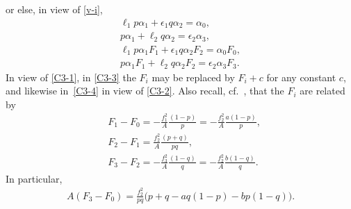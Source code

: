 \documentclass[pdftex]{sigma}
\numberwithin{equation}{section}
\begin{document}
or else, in view of \eqref{v-i},
\begin{gather} \ell _1 p \alpha _1 + \epsilon _1 q \alpha _2 = \alpha _0, \label{C3-1}\\
 p \alpha _1 + \ell _2 q \alpha _2 = \epsilon _2 \alpha _3,\label{C3-2} \\
 \ell _1 p \alpha _1 F_1 + \epsilon _1 q \alpha _2 F_2 = \alpha _0 F_0, \label{C3-3}\\
 p \alpha _1 F_1 + \ell _2 q \alpha _2 F_2 = \epsilon _2 \alpha _3 F_3. \label{C3-4}\end{gather}
In view of \eqref{C3-1}, in \eqref{C3-3} the $F_i$ may be replaced by $F_i + c$ for any constant $c$, and likewise in~\eqref{C3-4} in view of \eqref{C3-2}. Also recall, cf.\ \cite[Proposition 7.3]{BG}, that the $F_i$ are related by
\begin{align}
& F_1 - F_0 = - \frac{f_1 ^2}{A} \frac{(1 - p)}{p} = - \frac{f_2 ^2}{A} \frac{a (1 - p)}{p},\nonumber
\\& F_2 - F_1 = \frac{f_2^2}{A} \frac{(p + q)}{p q},\nonumber \\&
F_3 - F _2 = - \frac{f_3 ^2}{A} \frac{(1 - q)}{q} = - \frac{f_2^2}{A} \frac{b (1 - q)}{q}. \label{F-F} \end{align}
In particular,
\begin{gather} \label{F3-F0} A (F_3 - F _0) = \frac{f_2 ^2}{p q} \big(p + q - a q (1 - p) - b p (1 - q)\big). \end{gather}
\end{document}
